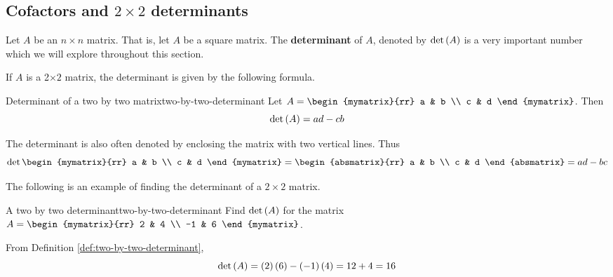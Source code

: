 \subsection{Cofactors and \texorpdfstring{$2\times 2$}{2x2} determinants}

Let $A$ be an $n\times n$ matrix. That is, let $A$ be a square matrix. The \textbf{determinant} of $A$, denoted
by $\det \left(A\right) $ is a very important number which we will explore throughout this section. 

If $A$ is a 2$\times 2$
matrix, the determinant is given by the following formula.

\begin{definition}{Determinant of a two by two matrix}{two-by-two-determinant}
Let $A=\begin{mymatrix}{rr}
a & b \\
c & d
\end{mymatrix}$. Then
\begin{equation*}
\det \left(A\right)  = ad-cb
\end{equation*}
\end{definition}

The determinant is also often denoted by enclosing the matrix with two
vertical lines. Thus
\begin{equation*}
\det \begin{mymatrix}{rr}
a & b \\
c & d
\end{mymatrix} =\begin{absmatrix}{rr}
a & b \\
c & d
\end{absmatrix} 
=ad - bc
\end{equation*}

The following is an example of finding the determinant of a $2 \times 2$ matrix.

\begin{example}{A two by two determinant}{two-by-two-determinant}
Find $\det\left(A\right) $ for the matrix
$A =  \begin{mymatrix}{rr}
2 & 4 \\
-1 & 6
\end{mymatrix} $.
\end{example}

\begin{solution} From Definition \ref{def:two-by-two-determinant},
\begin{equation*}
\det \left(A\right) = \left(2\right) \left(6\right) -\left(
-1\right) \left(4\right) = 12 + 4 = 16
\end{equation*}
\end{solution} 

